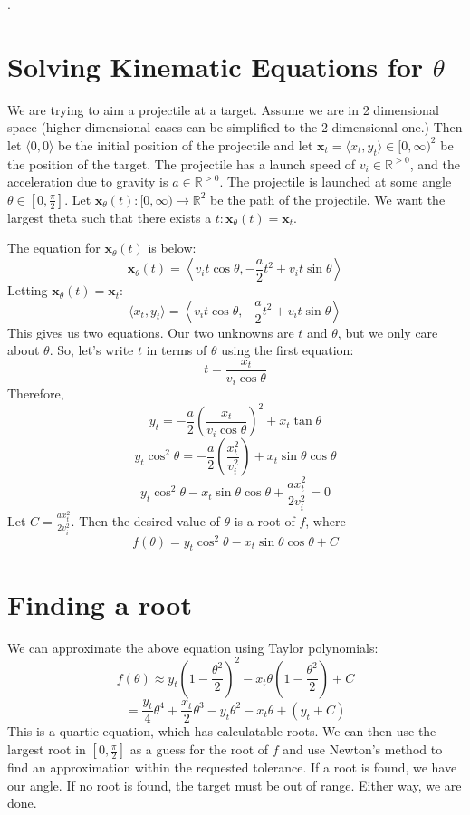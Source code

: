 \documentclass{report}
\begin{document}
.
	\section*{Solving Kinematic Equations for $\theta$}
	
	We are trying to aim a projectile at a target. Assume we are in 2 dimensional space (higher dimensional cases can be simplified to the 2 dimensional one.) Then let $\langle 0, 0\rangle$ be the initial position of the projectile and let $\mathbf x_t = \langle x_t, y_t\rangle\in\mathbb [0, \infty)^2$ be the position of the target. The projectile has a launch speed of $v_i\in\mathbb R^{>0}$, and the acceleration due to gravity is $a\in\mathbb R^{> 0}$. The projectile is launched at some angle $\theta \in \left[0, \frac \pi 2\right]$. Let $\mathbf x_\theta(t): [0, \infty) \to \mathbb R^2$ be the path of the projectile. We want the largest theta such that there exists a $t: \mathbf x_\theta(t) = \mathbf x_t$.
	
	The equation for $\mathbf x_\theta(t)$ is below:
	$$\mathbf x_\theta(t) =  \left\langle v_it \cos\theta,-\frac a 2 t^2 + v_i t \sin\theta\right\rangle$$
	Letting $\mathbf x_\theta(t) = \mathbf x_t$:
	$$\langle x_t, y_t\rangle =  \left\langle v_it \cos\theta,-\frac a 2 t^2 + v_i t \sin\theta\right\rangle$$
	This gives us two equations. Our two unknowns are $t$ and $\theta$, but we only care about $\theta$. So, let's write $t$ in terms of $\theta$ using the first equation:
	$$t = \frac {x_t}{v_i \cos\theta}$$
	Therefore, 
	$$y_t = -\frac a 2 \left(\frac {x_t} {v_i \cos \theta}\right)^2 + x_t \tan\theta$$
	$$y_t \cos^2\theta= -\frac a 2 \left(\frac {x_t ^2} {v_i ^2}\right) + x_t \sin\theta\cos\theta$$
	$$y_t\cos^2\theta - x_t\sin\theta\cos\theta + \frac {ax_t^2}{2v_i^2} = 0$$
	Let $C = \frac{ax_t^2}{2v_i^2}$. Then the desired value of $\theta$ is a root of $f$, where 
	$$f(\theta) = y_t\cos^2\theta-x_t\sin\theta\cos\theta + C$$
	
	\section*{Finding a root}
	We can approximate the above equation using Taylor polynomials:
	$$f(\theta) \approx y_t\left(1-\frac {\theta^2}2\right)^2 - x_t\theta\left(1-\frac{\theta^2}2\right)+C$$
	$$=\frac{y_t} 4 \theta^4 + \frac{x_t}{2}\theta^3 - y_t\theta^2 - x_t\theta+(y_t+C)$$
	This is a quartic equation, which has calculatable roots. We can then use the largest root in $\left[0, \frac\pi 2\right]$ as a guess for the root of $f$ and use Newton's method to find an approximation within the requested tolerance. If a root is found, we have our angle. If no root is found, the target must be out of range. Either way, we are done.
\end{document}
